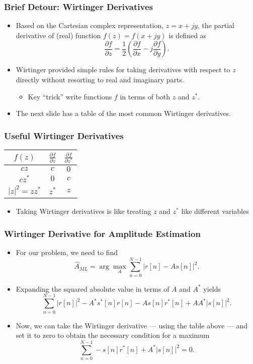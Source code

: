 \begin{frame}
  \frametitle{Brief Detour: Wirtinger Derivatives}
  \begin{itemize}
  \item Based on the Cartesian complex representation, $z=x+jy$, the
    partial derivative of (real) function $f(z) = f(x+jy)$ is defined
    as
    \[
      \frac{\partial f}{\partial z} = \frac{1}{2} (
      \frac{\partial f}{\partial x} -j
      \frac{\partial f}{\partial y}).
    \]
  \item Wirtinger provided simple rules for taking derivatives with
    respect to $z$ directly without resorting to real and imaginary
    parts.
    \begin{itemize}
    \item Key ``trick'' write functions $f$ in terms of both $z$ and $z^*$.
    \end{itemize}
  \item The next slide has a table of the most common Wirtinger derivatives.
  \end{itemize}
\end{frame}

\begin{frame}
  \frametitle{Useful Wirtinger Derivatives}
  \begin{center}
    \begin{tabular}{|c|cc|}
      \hline
      $f(z)$ &  $\frac{\partial f}{\partial z}$ &  $\frac{\partial f}{\partial z^*}$ \\
      \hline
      $cz$ & $c$ & $0$ \\
      $cz^*$ & $0$ & $c$ \\
      $|z|^2 = zz^*$ & $z^*$ & $z$ \\
      \hline
    \end{tabular}
  \end{center}
  \begin{itemize}
  \item Taking Wirtinger derivatives is like treating $z$ and $z^*$
    like different variables
  \end{itemize}
\end{frame}

\begin{frame}
  \frametitle{Wirtinger Derivative for Amplitude Estimation}
  \begin{itemize}
  \item For our problem, we need to find
    \[
     \hat{A}_{ML} = \arg \max_A \sum_{n=0}^{N-1} |r[n] - As[n]|^2.
    \]
  \item Expanding the squared absolute value in terms of $A$ and $A^*$
    yields
    \[
     \sum_{n=0}^{N-1} |r[n]|^2 - A^*s^*[n]r[n] - As[n]r^*[n] + AA^*
     |s[n]|^2.
   \]
  \item Now, we can take the Wirtinger derivative --- using the table
    above --- and set it to zero to obtain the necessary condition for
    a maximum
    \[
      \sum_{n=0}^{N-1} -s[n]r^*[n] + A^* |s[n]|^2 = 0.
    \]
  \end{itemize}
\end{frame}
 
